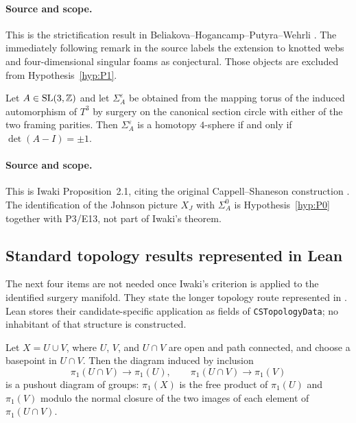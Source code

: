 \paragraph{Source and scope.}
This is the strictification result in Beliakova--Hogancamp--Putyra--Wehrli
\cite[Theorem~4.6]{BeliakovaHogancampPutyraWehrli2023}.  The immediately
following remark in the source labels the extension to knotted webs and
four-dimensional singular foams as conjectural.  Those objects are excluded
from Hypothesis~\ref{hyp:P1}.

\begin{externalresult}\label{prop:cs-criterion}
Let $A\in\mathrm{SL}(3,\mathbb{Z})$ and let $\Sigma_A^\varepsilon$ be obtained from the
mapping torus of the induced automorphism of $T^3$ by surgery on the canonical
section circle with either of the two framing parities.  Then
$\Sigma_A^\varepsilon$ is a homotopy $4$-sphere if and only if
$\det(A-I)=\pm1$.
\end{externalresult}

\paragraph{Source and scope.}
This is Iwaki Proposition~2.1, citing the original Cappell--Shaneson
construction \cite[Proposition~2.1]{Iwaki2024,CappellShaneson1976}.
The identification of the Johnson picture $X_J$ with $\Sigma_A^0$ is
Hypothesis~\ref{hyp:P0} together with P3/E13, not part of Iwaki's theorem.

\subsection{Standard topology results represented in Lean}

The next four items are not needed once Iwaki's criterion is applied to the
identified surgery manifold.  They state the longer topology route represented
in .  Lean stores their candidate-specific
application as fields of \texttt{CSTopologyData}; no inhabitant of that
structure is constructed.

\begin{externalresult}\label{prop:van-kampen}
Let $X=U\cup V$, where $U$, $V$, and $U\cap V$ are open and path connected,
and choose a basepoint in $U\cap V$.  Then the diagram induced by inclusion
\[
\pi_1(U\cap V)\longrightarrow\pi_1(U),
\qquad
\pi_1(U\cap V)\longrightarrow\pi_1(V)
\]
is a pushout diagram of groups: $\pi_1(X)$ is the free product of
$\pi_1(U)$ and $\pi_1(V)$ modulo the normal closure of the two images of each
element of $\pi_1(U\cap V)$.
\end{externalresult}

